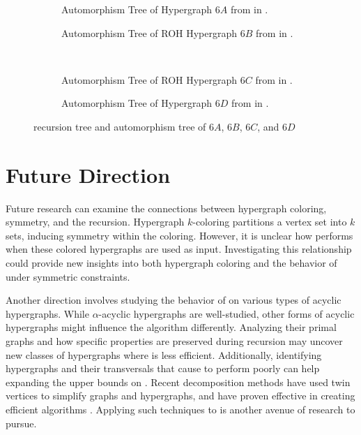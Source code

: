 \begin{figure}[p]
\centering
\begin{subfigure}{0.48\linewidth}\centering\resizebox{\linewidth}{!}{}\caption{Automorphism Tree of Hypergraph $6A$ from \cite{SS24} in \FKA.}\end{subfigure}\hfill
\begin{subfigure}{0.48\linewidth}\centering\resizebox{\linewidth}{!}{}\caption{Automorphism Tree of ROH Hypergraph $6B$ from \cite{SS24} in \FKA.}\end{subfigure}\\[10pt]
\begin{subfigure}{0.48\linewidth}\centering\resizebox{0.8\linewidth}{!}{}\caption{Automorphism Tree of ROH Hypergraph $6C$ from \cite{SS24} in \FKA.}\end{subfigure}\hfill
\begin{subfigure}{0.48\linewidth}\centering\resizebox{\linewidth}{!}{}\caption{Automorphism Tree of Hypergraph $6D$ from \cite{SS24} in \FKA.}\end{subfigure}
\caption{\FKA{} recursion tree and automorphism tree of $6A$, $6B$, $6C$, and $6D$}
\end{figure}

\section{Future Direction}

Future research can examine the connections between hypergraph coloring, symmetry, and the \FKA{} recursion. Hypergraph $k$-coloring partitions a vertex set into $k$ sets, inducing symmetry within the coloring. However, it is unclear how \FKA{} performs when these colored hypergraphs are used as input. Investigating this relationship could provide new insights into both hypergraph coloring and the behavior of \FKA{} under symmetric constraints.

Another direction involves studying the behavior of \FKA{} on various types of acyclic hypergraphs. While $\alpha$-acyclic hypergraphs are well-studied, other forms of acyclic hypergraphs might influence the algorithm differently. Analyzing their primal graphs and how specific properties are preserved during recursion may uncover new classes of hypergraphs where \FKA{} is less efficient. Additionally, identifying hypergraphs and their transversals that cause \FKA{} to perform poorly can help expanding the upper bounds on \FKA. Recent decomposition methods have used twin vertices to simplify graphs and hypergraphs, and have proven effective in creating efficient algorithms \cite{RMN06}. Applying such techniques to \FKA{} is another avenue of research to pursue.
